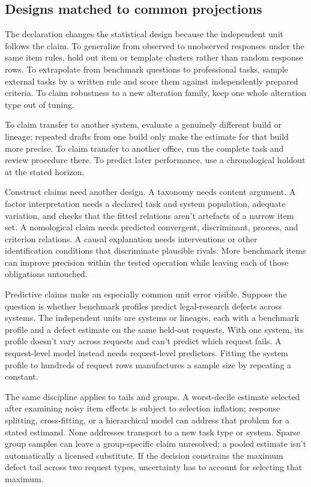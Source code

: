 \documentclass[12pt]{article}
\begin{document}
\subsection{Designs matched to common projections}\label{ssec:matched_designs}

The declaration changes the statistical design because the independent unit follows the claim. To generalize from observed to unobserved responses under the same item rules, hold out item or template clusters rather than random response rows. To extrapolate from benchmark questions to professional tasks, sample external tasks by a written rule and score them against independently prepared criteria. To claim robustness to a new alteration family, keep one whole alteration type out of tuning.

To claim transfer to another system, evaluate a genuinely different build or lineage; repeated drafts from one build only make the estimate for that build more precise. To claim transfer to another office, run the complete task and review procedure there. To predict later performance, use a chronological holdout at the stated horizon.

Construct claims need another design. A taxonomy needs content argument. A factor interpretation needs a declared task and system population, adequate variation, and checks that the fitted relations aren't artefacts of a narrow item set. A nomological claim needs predicted convergent, discriminant, process, and criterion relations. A causal explanation needs interventions or other identification conditions that discriminate plausible rivals. More benchmark items can improve precision within the tested operation while leaving each of those obligations untouched.

Predictive claims make an especially common unit error visible. Suppose the question is whether benchmark profiles predict legal-research defects across systems. The independent units are systems or lineages, each with a benchmark profile and a defect estimate on the same held-out requests. With one system, its profile doesn't vary across requests and can't predict which request fails. A request-level model instead needs request-level predictors. Fitting the system profile to hundreds of request rows manufactures a sample size by repeating a constant.

The same discipline applies to tails and groups. A worst-decile estimate selected after examining noisy item effects is subject to selection inflation; response splitting, cross-fitting, or a hierarchical model can address that problem for a stated estimand. None addresses transport to a new task type or system. Sparse group samples can leave a group-specific claim unresolved; a pooled estimate isn't automatically a licensed substitute. If the decision constrains the maximum defect tail across two request types, uncertainty has to account for selecting that maximum.
\end{document}

